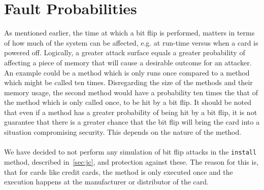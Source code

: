 \section{Fault Probabilities}
As mentioned earlier, the time at which a bit flip is performed, matters in terms of how much of the system can be affected, e.g. at run-time versus when a card is powered off. Logically, a greater attack surface equals a greater probability of affecting a piece of memory that will cause a desirable outcome for an attacker. An example could be a method which is only runs once compared to a method which might be called ten times. Disregarding the size of the methods and their memory usage, the second method would have a probability ten times the that of the method which is only called once, to be hit by a bit flip. It should be noted that even if a method has a greater probability of being hit by a bit flip, it is not guarantee that there is a greater chance that the bit flip will bring the card into a situation compromising security. This depends on the nature of the method.\\\\
We have decided to not perform any simulation of bit flip attacks in the \texttt{install} method, described in~\cref{sec:jc}, and protection against these. The reason for this is, that for cards like credit cards, the method is only executed once and the execution happens at the manufacturer or distributor of the card.

%
